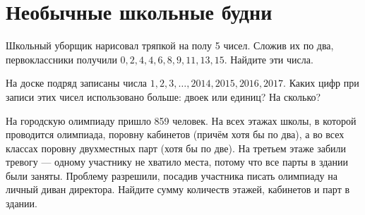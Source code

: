 \section{Необычные школьные будни}
\begin{enumerate}

\itA Школьный уборщик нарисовал тряпкой на полу 5 чисел. Сложив их по два, первоклассники получили $0, 2, 4, 4, 6, 8, 9, 11, 13, 15$. Найдите эти числа.

\itB На доске подряд записаны числа $1,2,3,\dots, 2014, 2015, 2016, 2017.$ Каких цифр при записи этих чисел использовано больше: двоек или единиц? На сколько?

\itC На городскую олимпиаду пришло 859 человек. На всех этажах школы, в которой проводится олимпиада, поровну кабинетов (причём хотя бы по два), а во всех классах поровну двухместных парт (хотя бы по две). На третьем этаже забили тревогу — одному участнику не хватило места, потому что все парты в здании были заняты. Проблему разрешили, посадив участника писать олимпиаду на личный диван директора. Найдите сумму количеств этажей, кабинетов и парт в здании.
\end{enumerate}